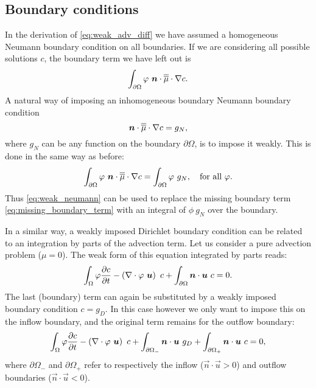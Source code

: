 \subsection{Boundary conditions}
In the derivation of \eqref{eq:weak_adv_diff} we have assumed a homogeneous Neumann
boundary condition on all boundaries. If we are considering all possible
solutions $c$, the boundary term we have left out is
\begin{equation}\label{eq:missing_boundary_term}
  \int_{\partial\Omega} \varphi~{\mbox{\boldmath$n$}}\cdot\overline{\overline{\mu}}\cdot\nabla c.
\end{equation}
A natural way of imposing an inhomogeneous boundary Neumann boundary condition
\begin{equation*}
  {\mbox{\boldmath$n$}}\cdot\overline{\overline{\mu}}\cdot\nabla c=g_N,
\end{equation*}
where $g_N$ can be any function on the boundary $\partial\Omega$, is to impose it
weakly. This is done in the same way as before:
\begin{equation}\label{eq:weak_neumann}
  \int_{\partial\Omega} \varphi~{\mbox{\boldmath$n$}}\cdot\overline{\overline{\mu}}\cdot\nabla c=
    \int_{\partial\Omega} \varphi~g_N, \quad \text{for all }\varphi.
\end{equation}
Thus \eqref{eq:weak_neumann} can be used to replace the missing
boundary term \eqref{eq:missing_boundary_term} with an integral of $\phi~g_N$
over the boundary.

In a similar way, a weakly imposed Dirichlet boundary condition can be related to an
integration by parts of the advection term. Let us consider a pure advection problem
($\mu=0$). The weak form of this equation integrated by parts reads:
\begin{equation*}
  \int_\Omega \varphi \frac{\partial c}{\partial t} -
    \left(\nabla\cdot \varphi~{\mbox{\boldmath$u$}}\right)~c +
    \int_{\partial\Omega} {\mbox{\boldmath$n$}}\cdot{\mbox{\boldmath$u$}}~c
    = 0.
\end{equation*}
The last (boundary) term can again be substituted by a weakly imposed
boundary condition $c=g_D$.  In this case however we only want to impose
this on the inflow boundary, and the original term remains for the outflow
boundary:
\begin{equation}\label{eq:adv_integrated_by_parts}
  \int_\Omega \varphi \frac{\partial c}{\partial t} -
    \left(\nabla\cdot \varphi~{\mbox{\boldmath$u$}}\right)~c +
    \int_{\partial\Omega_-} {\mbox{\boldmath$n$}}\cdot{\mbox{\boldmath$u$}}~g_D +
    \int_{\partial\Omega_+} {\mbox{\boldmath$n$}}\cdot{\mbox{\boldmath$u$}}~c
    = 0,
\end{equation}
where $\partial\Omega_-$ and $\partial\Omega_+$ refer to respectively
the inflow ($\vec{n}\cdot\vec{u}>0$) and outflow boundaries ($\vec{n}\cdot\vec{u}<0$).

